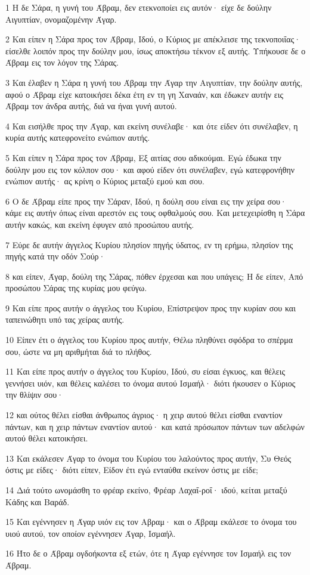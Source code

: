 \par 1 Η δε Σάρα, η γυνή του Άβραμ, δεν ετεκνοποίει εις αυτόν· είχε δε δούλην Αιγυπτίαν, ονομαζομένην Άγαρ.
\par 2 Και είπεν η Σάρα προς τον Άβραμ, Ιδού, ο Κύριος με απέκλεισε της τεκνοποιΐας· είσελθε λοιπόν προς την δούλην μου, ίσως αποκτήσω τέκνον εξ αυτής. Υπήκουσε δε ο Άβραμ εις τον λόγον της Σάρας.
\par 3 Και έλαβεν η Σάρα η γυνή του Άβραμ την Άγαρ την Αιγυπτίαν, την δούλην αυτής, αφού ο Άβραμ είχε κατοικήσει δέκα έτη εν τη γη Χαναάν, και έδωκεν αυτήν εις Άβραμ τον άνδρα αυτής, διά να ήναι γυνή αυτού.
\par 4 Και εισήλθε προς την Άγαρ, και εκείνη συνέλαβε· και ότε είδεν ότι συνέλαβεν, η κυρία αυτής κατεφρονείτο ενώπιον αυτής.
\par 5 Και είπεν η Σάρα προς τον Άβραμ, Εξ αιτίας σου αδικούμαι. Εγώ έδωκα την δούλην μου εις τον κόλπον σου· και αφού είδεν ότι συνέλαβεν, εγώ κατεφρονήθην ενώπιον αυτής· ας κρίνη ο Κύριος μεταξύ εμού και σου.
\par 6 Ο δε Άβραμ είπε προς την Σάραν, Ιδού, η δούλη σου είναι εις την χείρα σου· κάμε εις αυτήν όπως είναι αρεστόν εις τους οφθαλμούς σου. Και μετεχειρίσθη η Σάρα αυτήν κακώς, και εκείνη έφυγεν από προσώπου αυτής.
\par 7 Εύρε δε αυτήν άγγελος Κυρίου πλησίον πηγής ύδατος, εν τη ερήμω, πλησίον της πηγής κατά την οδόν Σούρ·
\par 8 και είπεν, Άγαρ, δούλη της Σάρας, πόθεν έρχεσαι και που υπάγεις; Η δε είπεν, Από προσώπου Σάρας της κυρίας μου φεύγω.
\par 9 Και είπε προς αυτήν ο άγγελος του Κυρίου, Επίστρεψον προς την κυρίαν σου και ταπεινώθητι υπό τας χείρας αυτής.
\par 10 Είπεν έτι ο άγγελος του Κυρίου προς αυτήν, Θέλω πληθύνει σφόδρα το σπέρμα σου, ώστε να μη αριθμήται διά το πλήθος.
\par 11 Και είπε προς αυτήν ο άγγελος του Κυρίου, Ιδού, συ είσαι έγκυος, και θέλεις γεννήσει υιόν, και θέλεις καλέσει το όνομα αυτού Ισμαήλ· διότι ήκουσεν ο Κύριος την θλίψιν σου·
\par 12 και ούτος θέλει είσθαι άνθρωπος άγριος· η χειρ αυτού θέλει είσθαι εναντίον πάντων, και η χειρ πάντων εναντίον αυτού· και κατά πρόσωπον πάντων των αδελφών αυτού θέλει κατοικήσει.
\par 13 Και εκάλεσεν Άγαρ το όνομα του Κυρίου του λαλούντος προς αυτήν, Συ Θεός όστις με είδες· διότι είπεν, Είδον έτι εγώ ενταύθα εκείνον όστις με είδε;
\par 14 Διά τούτο ωνομάσθη το φρέαρ εκείνο, Φρέαρ Λαχαΐ-ροΐ· ιδού, κείται μεταξύ Κάδης και Βαράδ.
\par 15 Και εγέννησεν η Άγαρ υιόν εις τον Αβραμ· και ο Άβραμ εκάλεσε το όνομα του υιού αυτού, τον οποίον εγέννησεν Άγαρ, Ισμαήλ.
\par 16 Ήτο δε ο Άβραμ ογδοήκοντα εξ ετών, ότε η Άγαρ εγέννησε τον Ισμαήλ εις τον Άβραμ.

